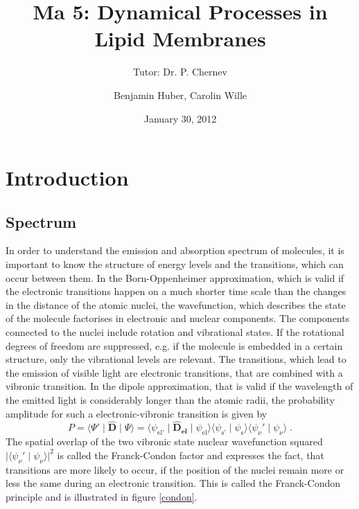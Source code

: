 \documentclass[a4paper]{scrartcl}
\title{Ma 5: Dynamical Processes in Lipid Membranes}
\subtitle{Tutor: Dr. P. Chernev}
\author{Benjamin Huber, Carolin Wille}
\date{January 30, 2012}
\numberwithin{equation}{section}
\numberwithin{figure}{section}
\numberwithin{table}{section}
\newcommand{\eq}[2]{\begin{equation}#1\label{#2}\end{equation}}
\newcommand{\ve}[1]{\mathbf{ #1} }
\begin{document}
\thispagestyle{empty}
\maketitle
\tableofcontents
\clearpage

\section{Introduction}
\subsection{Spectrum}
In order to understand the emission and absorption spectrum of molecules, it is important to know the structure of energy levels and the transitions, which can occur between them. In the Born-Oppenheimer approximation, which is valid if the electronic transitions happen on a much shorter time scale than the changes in the distance of the atomic nuclei, the wavefunction, which describes the state of the molecule factorises in electronic and nuclear components. The components connected to the nuclei include rotation and vibrational states. If the rotational degrees of freedom are suppressed, e.g. if the molecule is embedded in a certain structure, only the vibrational levels are relevant. The transitions, which lead to the emission of visible light are electronic transitions, that are combined with a vibronic transition. In the dipole approximation, that is valid if the wavelength of the emitted light is considerably longer than the atomic radii, the probability amplitude for such a electronic-vibronic transition is given by 
\eq{ P = \langle \Psi'  \mid   \ve {\hat{D}} \mid \Psi \rangle =  \langle \psi_\text{el'} \mid   \ve {\hat{D}_{el}} \mid \psi_\text{el} \rangle \langle \psi_\text{s'} \mid \psi_\text{s} \rangle \langle \psi_\nu'  \mid  \psi_\nu \rangle \; .} {transition }
The spatial overlap of the two vibronic state nuclear wavefunction squared  $\lvert \langle \psi_\nu'  \mid  \psi_\nu \rangle \rvert ^2$ is called the Franck-Condon factor and expresses the fact, that transitions are more likely to occur, if the position of the nuclei remain more or less the same during an electronic transition. This is called the Franck-Condon principle and is illustrated in figure \ref{condon}.
\end{document}
